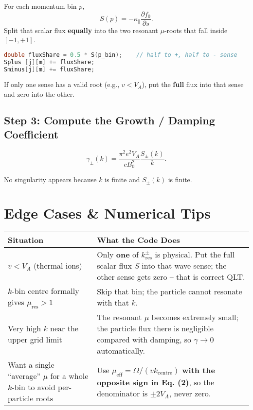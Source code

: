 For each momentum bin $p$,
\[
S(p) = -\kappa_\parallel \frac{\partial f_0}{\partial s}.
\]
Split that scalar flux \textbf{equally} into the two resonant $\mu$-roots that fall inside $[-1,+1]$.

\begin{lstlisting}[language=C++, basicstyle=\ttfamily\small]
double fluxShare = 0.5 * S(p_bin);    // half to +, half to - sense
Splus [j][m] += fluxShare;
Sminus[j][m] += fluxShare;
\end{lstlisting}

If only one sense has a valid root (e.g., $v < V_A$), put the \textbf{full} flux into that sense and zero into the other.

\subsection*{Step 3: Compute the Growth / Damping Coefficient}

\[
\gamma_\pm(k) = \frac{\pi^2 e^2 V_A}{c B_0^2} \frac{S_\pm(k)}{k}. \tag{3}
\]

No singularity appears because $k$ is finite and $S_\pm(k)$ is finite.

\section*{Edge Cases \& Numerical Tips}

\begin{table}[h!]
\centering
\begin{tabular}{|p{5cm}|p{9cm}|}
\hline
\textbf{Situation} & \textbf{What the Code Does} \\
\hline
$v < V_A$ (thermal ions) & Only \textbf{one} of $k_{\text{res}}^{\pm}$ is physical. Put the full scalar flux $S$ into that wave sense; the other sense gets zero -- that is correct QLT. \\
\hline
$k$-bin centre formally gives $\mu_{\text{res}} > 1$ & Skip that bin; the particle cannot resonate with that $k$. \\
\hline
Very high $k$ near the upper grid limit & The resonant $\mu$ becomes extremely small; the particle flux there is negligible compared with damping, so $\gamma \to 0$ automatically. \\
\hline
Want a single ``average'' $\mu$ for a whole $k$-bin to avoid per-particle roots & Use $\mu_{\text{eff}} = \Omega / (v k_{\text{centre}})$ \textbf{with the opposite sign in Eq. (2)}, so the denominator is $\pm 2 V_A$, never zero. \\
\hline
\end{tabular}
\end{table}


